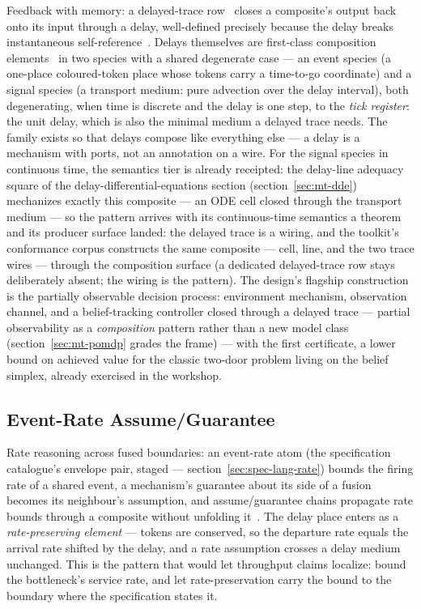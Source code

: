 Feedback with memory: a delayed-trace row~\cite{sprunger19a} closes a
composite's output
back onto its input through a delay, well-defined precisely because
the delay breaks instantaneous self-reference~\cite{dangelo25}.
Delays themselves are
first-class composition elements~\cite{lavore22} in two species with a shared
degenerate case --- an event species (a one-place coloured-token
place whose tokens carry a time-to-go coordinate) and a signal
species (a transport medium: pure advection over the delay interval),
both degenerating, when time is discrete and the delay is one step,
to the \emph{tick register}: the unit delay, which is also the
minimal medium a delayed trace needs. The family exists so that
delays compose like everything else --- a delay is a mechanism with
ports, not an annotation on a wire. For the signal species in
continuous time, the semantics tier is already receipted: the
delay-line adequacy square of the delay-differential-equations
section (section~\ref{sec:mt-dde}) mechanizes exactly this
composite --- an ODE cell closed through the transport medium ---
so the pattern arrives with its continuous-time semantics a theorem
and its producer surface landed: the delayed trace is a wiring, and
the toolkit's conformance corpus constructs the same composite ---
cell, line, and the two trace wires --- through the composition
surface (a dedicated delayed-trace row stays deliberately absent;
the wiring is the pattern). The design's flagship
construction is the partially observable decision process:
environment mechanism, observation channel, and a belief-tracking
controller closed through a delayed trace --- partial observability
as a \emph{composition} pattern rather than a new model class
(section~\ref{sec:mt-pomdp} grades the frame) --- with the first
certificate, a lower bound on achieved value for the classic
two-door problem living on the belief simplex, already exercised in
the workshop.

\subsection{Event-Rate Assume/Guarantee}

Rate reasoning across fused boundaries: an event-rate atom (the
specification catalogue's envelope pair, staged ---
section~\ref{sec:spec-lang-rate}) bounds the
firing rate of a shared event, a mechanism's guarantee about its side
of a fusion becomes its neighbour's assumption, and assume/guarantee
chains propagate rate bounds through a composite without unfolding
it~\cite{brieger24}. The delay place enters as a \emph{rate-preserving element} ---
tokens are conserved, so the departure rate equals the arrival rate
shifted by the delay, and a rate assumption crosses a delay medium
unchanged. This is the pattern that would let throughput claims
localize: bound the bottleneck's service rate, and let
rate-preservation carry the bound to the boundary where the
specification states it.

